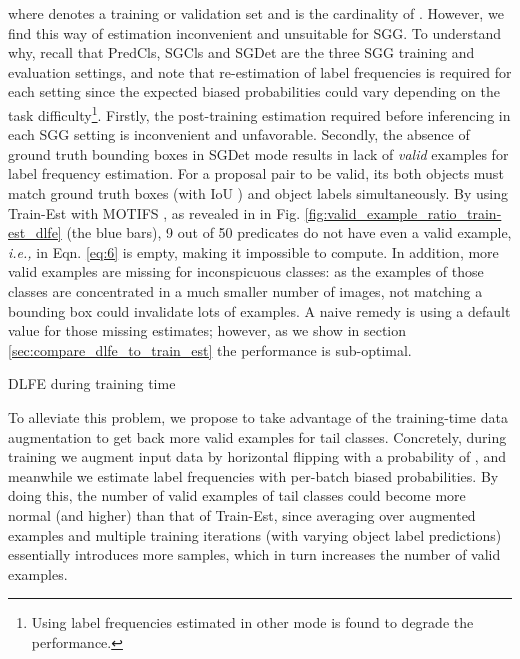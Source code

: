 \documentclass[sigconf]{acmart}
\begin{document}
where  denotes a training or validation set and  is the cardinality of .
However, we find this way of estimation inconvenient and unsuitable for SGG.
To understand why, recall that PredCls, SGCls and SGDet are the three SGG training and evaluation settings, and note that re-estimation of label frequencies is required for each setting since the expected biased probabilities could vary depending on the task difficulty\footnote{Using label frequencies estimated in other mode is found to degrade the performance.}.
Firstly, the post-training estimation required before inferencing in each SGG setting is inconvenient and unfavorable.
Secondly, the absence of ground truth bounding boxes in SGDet mode results in lack of \textit{valid} examples for label frequency estimation.
For a proposal pair to be valid, its both objects must match ground truth boxes (with IoU ) and object labels simultaneously.
By using Train-Est with MOTIFS \cite{zellers2018neural}, as revealed in in Fig. \ref{fig:valid_example_ratio_train-est_dlfe} (the blue bars), 9 out of 50 predicates do not have even a valid example, \emph{i.e.,}  in Eqn. \ref{eq:6} is empty, making it impossible to compute.
In addition, more valid examples are missing for inconspicuous classes: as the examples of those classes are concentrated in a much smaller number of images, not matching a bounding box could invalidate lots of examples.
A naive remedy is using a default value for those missing estimates; however, as we show in section \ref{sec:compare_dlfe_to_train_est} the performance is sub-optimal.

\begin{algorithm}[t]
\SetAlgoLined
{}
 
\; 
 \caption{DLFE during training time}
 \label{alg:dlfe_train}
\end{algorithm}

To alleviate this problem, we propose to take advantage of the training-time data augmentation to get back more valid examples for tail classes.
Concretely, during training we augment input data by horizontal flipping with a probability of , and meanwhile we estimate label frequencies with per-batch biased probabilities.
By doing this, the number of valid examples of tail classes could become more normal (and higher) than that of Train-Est, since averaging over augmented examples and multiple training iterations (with varying object label predictions) essentially introduces more samples, which in turn increases the number of valid examples.
\end{document}
